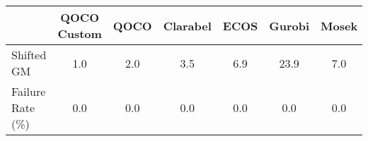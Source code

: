 \begin{tabular}{lcccccc}
  \hline
    & \textbf{QOCO Custom}   & \textbf{QOCO} & \textbf{Clarabel} & \textbf{ECOS} & \textbf{Gurobi} & \textbf{Mosek} \\ \hline
  Shifted GM & 1.0 & 2.0 & 3.5 & 6.9 & 23.9 & 7.0 \\ 
  Failure Rate (\%) & 0.0 & 0.0 & 0.0 & 0.0 & 0.0 & 0.0 \\ \hline 
\end{tabular}

